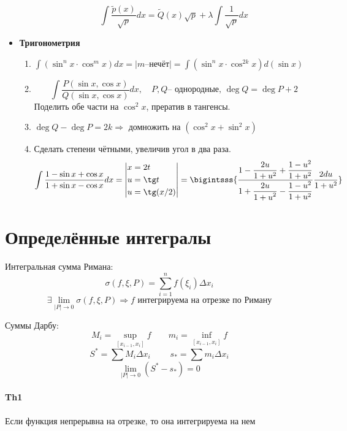 \documentclass{article}
\newcommand\ddfrac[2]{\frac{\displaystyle #1}{\displaystyle #2}}
\newcommand{\x}{\text}
\begin{document}
\begin{itemize}
\begin{enumerate}
                    $$ \int\frac{\widetilde{p}(x)}{\sqrt{p}}dx = \widetilde{Q}(x)\sqrt{p} + \lambda\int\frac{1}{\sqrt{p}}dx $$
          \end{enumerate}
    \item \textbf{Тригонометрия}
          \begin{enumerate}
              \item $\int (\sin^nx \cdot \cos^m x ) dx  = |m \x{--нечёт}| = \int (\sin^nx\cdot \cos^{2k}x)d(\sin x)$
              \item $$\int \frac{P(\sin x, \cos x)}{Q(\sin x, \cos x)} dx, \quad P,Q\x{-- однородные, } \deg Q = \deg P + 2$$
                    Поделить обе части на $\cos^2x$, прератив в тангенсы.
              \item $\deg Q - \deg P = 2k \Rightarrow $ домножить на $(\cos^2x + \sin^2 x)$
              \item Сделать степени чётными, увеличив угол в два раза.
                    \begin{equation*}
                        \int \frac{1- \sin x + \cos x}{1+ \sin x - \cos x} dx = \left|
                        \begin{aligned}
                             & x = 2t       \\
                             & u = \tg t    \\
                             & u = \tg(x/2)
                        \end{aligned} \right| = \bigintsss{\ddfrac{1 - \frac{2u}{1+u^2} + \frac{1 - u^2}{1 + u^2}}{1 + \ddfrac{2u}{1+u^2} - \frac{1-u^2}{1 + u^2}}\frac{2 du}{1 + u^2}}
                    \end{equation*}
          \end{enumerate}
\end{itemize}

\newpage
\section{Определённые интегралы}
Интегральная сумма Римана:
$$ \sigma(f,\xi,P) = \sum\limits_{i=1}^{n}f(\xi_i)\Delta x_i $$
$$ \exists \lim\limits_{|P|\to 0} \sigma(f,\xi, P) \Rightarrow f \x{ интегрируема на отрезке по Риману}$$

Суммы Дарбу:
$$ M_i = \sup\limits_{[x_{i-1},x_i]} f \qquad m_i = \inf\limits_{[x_{i-1},x_i]} f $$
$$ S^* = \sum M_i\Delta x_i \; \qquad s_* = \sum m_i \Delta x_i $$
$$ \lim\limits_{|P|\to 0}(S^* - s_*) = 0 $$

\paragraph*{Th1} Если функция непрерывна на отрезке, то она интегрируема на нем
\end{document}

